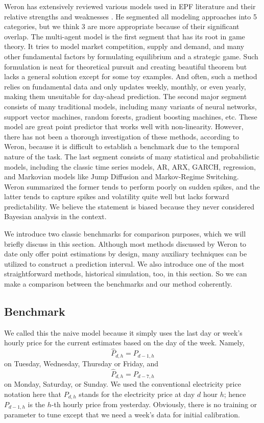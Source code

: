 \documentclass[11pt, letterpaper, journal]{IEEEtran}
\begin{document}
Weron has extensively reviewed various models used in EPF literature and their relative strengths and weaknesses \cite{WERON20141030}. He segmented all modeling approaches into 5 categories, but we think 3 are more appropriate because of their significant overlap. The multi-agent model is the first segment that has its root in game theory. It tries to model market competition, supply and demand, and many other fundamental factors by formulating equilibrium and a strategic game. Such formulation is neat for theoretical pursuit and creating beautiful theorem but lacks a general solution except for some toy examples. And often, such a method relies on fundamental data and only updates weekly, monthly, or even yearly, making them unsuitable for day-ahead prediction. The second major segment consists of many traditional models, including many variants of neural networks, support vector machines, random forests, gradient boosting machines, etc. These model are great point predictor that works well with non-linearity. However, there has not been a thorough investigation of these methods, according to Weron, because it is difficult to establish a benchmark due to the temporal nature of the task. The last segment consists of many statistical and probabilistic models, including the classic time series models, AR, ARX, GARCH, regression, and Markovian models like Jump Diffusion and Markov-Regime Switching. Weron summarized the former tends to perform poorly on sudden spikes, and the latter tends to capture spikes and volatility quite well but lacks forward predictability. We believe the statement is biased because they never considered Bayesian analysis in the context.

We introduce two classic benchmarks for comparison purposes, which we will briefly discuss in this section. Although most methods discussed by Weron to date only offer point estimations by design, many auxiliary techniques can be utilized to construct a prediction interval. We also introduce one of the most straightforward methods, historical simulation, too, in this section. So we can make a comparison between the benchmarks and our method coherently.

\subsection{Benchmark}
We called this the naive model because it simply uses the last day or week's hourly price for the current estimates based on the day of the week. Namely, $$\hat{P}_{d,h} = P_{d-1, h}$$ on Tuesday, Wednesday, Thursday or Friday, and $$\hat{P}_{d,h} = P_{d-7, h}$$ on Monday, Saturday, or Sunday. We used the conventional electricity price notation here that $P_{d,h}$ stands for the electricity price at day $d$ hour $h$; hence $P_{d-1, h}$ is the $h$-th hourly price from yesterday. Obviously, there is no training or parameter to tune except that we need a week's data for initial calibration.
\end{document}
